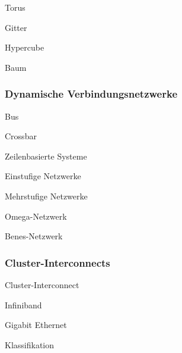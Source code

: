 \begin{defi}{Torus}
    
\end{defi}

\begin{defi}{Gitter}
    
\end{defi}

\begin{defi}{Hypercube}
    
\end{defi}

\begin{defi}{Baum}
    
\end{defi}

\subsubsection{Dynamische Verbindungsnetzwerke}

\begin{defi}{Bus}
    
\end{defi}

\begin{defi}{Crossbar}
    
\end{defi}

\begin{defi}{Zeilenbasierte Systeme}
    
\end{defi}

\begin{defi}{Einstufige Netzwerke}
    
\end{defi}

\begin{defi}{Mehrstufige Netzwerke}
    
\end{defi}

\begin{defi}{Omega-Netzwerk}
    
\end{defi}

\begin{defi}{Benes-Netzwerk}
    
\end{defi}

\subsubsection{Cluster-Interconnects}

\begin{defi}{Cluster-Interconnect}
    
\end{defi}

\begin{defi}{Infiniband}
    
\end{defi}

\begin{defi}{Gigabit Ethernet}
    
\end{defi}

\begin{defi}[Verbindungsnetzwerk]{Klassifikation}
    
\end{defi}

